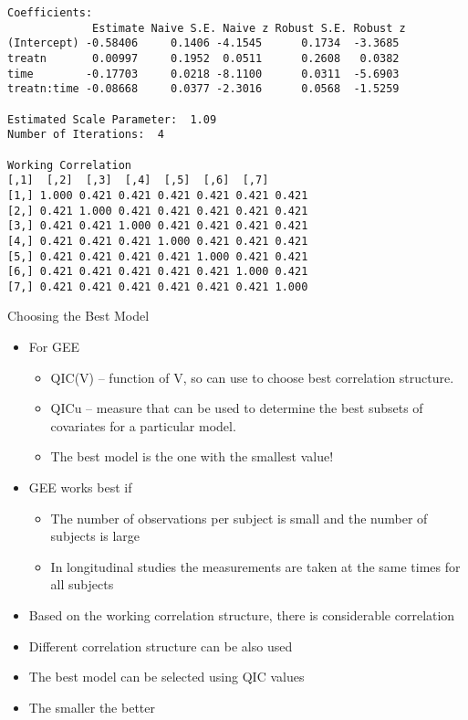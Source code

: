 \documentclass{beamer}
\begin{document}
\begin{frame}[fragile]{}
\scriptsize
\begin{verbatim}
Coefficients:
             Estimate Naive S.E. Naive z Robust S.E. Robust z
(Intercept) -0.58406     0.1406 -4.1545      0.1734  -3.3685
treatn       0.00997     0.1952  0.0511      0.2608   0.0382
time        -0.17703     0.0218 -8.1100      0.0311  -5.6903
treatn:time -0.08668     0.0377 -2.3016      0.0568  -1.5259

Estimated Scale Parameter:  1.09
Number of Iterations:  4

Working Correlation
[,1]  [,2]  [,3]  [,4]  [,5]  [,6]  [,7]
[1,] 1.000 0.421 0.421 0.421 0.421 0.421 0.421
[2,] 0.421 1.000 0.421 0.421 0.421 0.421 0.421
[3,] 0.421 0.421 1.000 0.421 0.421 0.421 0.421
[4,] 0.421 0.421 0.421 1.000 0.421 0.421 0.421
[5,] 0.421 0.421 0.421 0.421 1.000 0.421 0.421
[6,] 0.421 0.421 0.421 0.421 0.421 1.000 0.421
[7,] 0.421 0.421 0.421 0.421 0.421 0.421 1.000

\end{verbatim}
\end{frame}

\begin{frame}{Choosing the Best Model}
\begin{itemize}
	\item For GEE
	\begin{itemize}
		\item QIC(V) – function of V, so can use to choose best correlation structure.
		\item QICu – measure that can be used to determine the best subsets of covariates for a particular model.
		\item The best model is the one with the smallest value!
	\end{itemize}
	\item GEE works best if
	\begin{itemize}
		\item The number of observations per subject is small and the number of subjects is large
		\item In longitudinal studies the measurements are taken at the same times for all subjects
	\end{itemize}
\end{itemize}
\end{frame}

\begin{frame}{}
\begin{itemize}
	\item Based on the working correlation structure, there is considerable correlation 
	\item Different correlation structure can be also used 
	\item The best model can be selected using QIC values
	\item The smaller the better
\end{itemize}
\end{frame}
\end{document}
